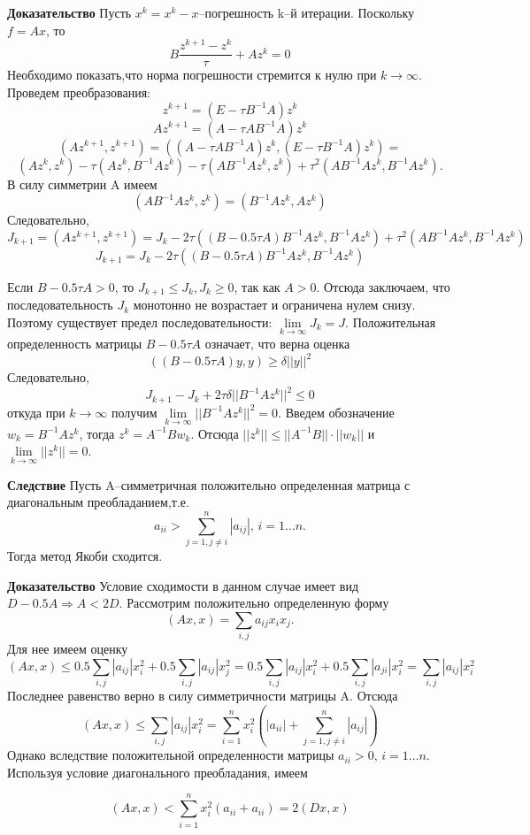 \documentclass{article}
\begin{document}
\begin{enumerate}
	
	\textbf{Доказательство} Пусть $x^k=x^k-x$--погрешность k--й итерации. Поскольку $f=Ax$, то 
	\[
	B\frac{z^{k+1}-z^k}{\tau} + Az^k = 0
	\]
	Необходимо показать,что норма погрешности стремится к нулю при $k \rightarrow \infty$. Проведем преобразования:
	\[
	z^{k+1}=(E-\tau B^{-1}A)z^k
	\]
	\[
	Az^{k+1}=(A-\tau AB^{-1}A)z^k
	\]
	\[
	(Az^{k+1},z^{k+1})= ((A-\tau AB^{-1}A)z^k, (E-\tau B^{-1}A)z^k)=
	\]
	\[
	(Az^k,z^k)-\tau (Az^k,B^{-1}Az^k) - \tau (AB^{-1}Az^k,z^k) + \tau^2(AB^{-1}Az^k,B^{-1}Az^k).
	\]
	В силу симметрии A имеем 
	\[
	(AB^{-1}Az^k,z^k) = (B^{-1}Az^k, Az^k)
	\]
	Следовательно,
	\[
	J_{k+1}=(Az^{k+1},z^{k+1}) = J_{k} - 2 \tau ((B-0.5 \tau A)B^{-1}Az^k,B^{-1}Az^k) + \tau^2(AB^{-1}Az^k,B^{-1}Az^k)
	\]
	\[
	J_{k+1}=J_k- 2 \tau ((B-0.5 \tau A)B^{-1}Az^k,B^{-1}Az^k)
	\]
	
	Если $B-0.5\tau A>0$, то $J_{k+1}\le J_{k}, J_{k} \ge 0$, так как $A>0$. Отсюда заключаем, что последовательность $J_k$ монотонно не возрастает и ограничена нулем снизу. Поэтому существует предел последовательности: $\lim \limits_{k \rightarrow \infty} J_k = J$. Положительная определенность матрицы $B-0.5\tau A$ означает, что верна оценка 
	\[
	((B-0.5\tau A)y,y) \ge \delta ||y||^2
	\]
	Следовательно, 
	\[
	J_{k+1}-J_k+2\tau \delta ||B^{-1}Az^k||^2 \le 0
	\]
	откуда при $k \rightarrow \infty$ получим $\lim\limits_{k \rightarrow \infty } ||B^{-1}Az^k||^2=0$. Введем обозначение $w_k=B^{-1}Az^k$, тогда $z^k=A^{-1}B w_k$. Отсюда $||z^k|| \le ||A^{-1}B|| \cdot ||w_k||$ и $\lim \limits_{k \rightarrow \infty}||z^k||=0$.
	
	\textbf{Следствие} Пусть A--симметричная положительно определенная матрица с диагональным преобладанием,т.е. 
	\[
		a_{ii} > \sum_{j=1,j \neq i}^{n} |a_{ij}|, \, i=1 \ldots n.
	\]
	Тогда метод Якоби сходится.
	
	\textbf{Доказательство} Условие сходимости в данном случае имеет вид $D-0.5A \Rightarrow A<2D$. Рассмотрим положительно определенную форму
	\[
	(Ax,x)= \sum_{i,j}a_{ij}x_i x_j.
	\] 
	Для нее имеем оценку 
	\[
	(Ax,x) \le 0.5 \sum_{i,j} |a_{ij}| x_i^2 + 0.5 \sum_{i,j} |a_{ij}| x_j^2=0.5 \sum_{i,j} |a_{ij}| x_i^2 + 0.5 \sum_{i,j} |a_{ji}| x_i^2 = \sum_{i,j}|a_{ij}| x_i^2
	\]
	Последнее равенство верно в силу симметричности матрицы A. Отсюда 
	\[
	(Ax,x) \le \sum_{i,j}|a_{ij}| x_i^2 = \sum_{i=1}^{n}x_i^2(|a_{ii}|+\sum_{j=1, j\neq i}^{n}|a_{ij}|)
	\]
	Однако вследствие положительной определенности матрицы $a_{ii}>0, \, i=1 \ldots n$. Используя условие диагонального преобладания, имеем 
	
	\[
	(Ax,x) < \sum_{i=1}^{n} x_i^2(a_{ii}+a_{ii})=2(Dx,x)
	\]
	

\end{enumerate}
\end{document}
